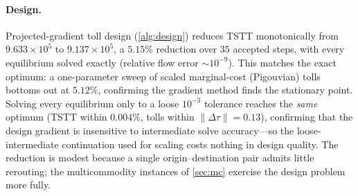 \documentclass[ijoc]{informs3}
\begin{document}
\paragraph{Design.}
Projected-gradient toll design (\cref{alg:design}) reduces TSTT monotonically from $9.633\times10^5$ to
$9.137\times10^5$, a $5.15\%$ reduction over $35$ accepted steps, with every equilibrium solved exactly
(relative flow error $\sim10^{-9}$). This matches the exact optimum: a one-parameter sweep of scaled
marginal-cost (Pigouvian) tolls bottoms out at $5.12\%$, confirming the gradient method finds the stationary
point. Solving every equilibrium only to a loose $10^{-3}$ tolerance reaches the \emph{same} optimum (TSTT within
$0.004\%$, tolls within $\|\Delta\tau\|=0.13$), confirming that the design gradient is insensitive to
intermediate solve accuracy---so the loose-intermediate continuation used for scaling costs nothing in design
quality. The reduction is modest because a single origin--destination pair admits little rerouting; the
multicommodity instances of \cref{sec:mc} exercise the design problem more fully.
\end{document}
